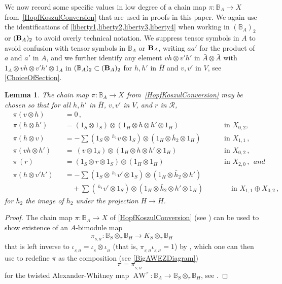 \documentclass[11pt]{amsart}
\numberwithin{equation}{section}
\newtheorem{lemma}[equation]{Lemma}
\newcommand{\R}{\mathcal{R}}
\newcommand{\B}{{\bf B}} %
\newcommand{\BB}{\mathbb{B}} %
\DeclareMathOperator{\AW}{AW}
\DeclareMathOperator{\AWt}{\AW^{\tau}}
\renewcommand{\_}[1]{\mbox{$_{\left( #1 \right)}$}}
\newcommand{\ot}{\otimes}
\newcommand{\ott}{\otimes_{\tau}}
\begin{document}
{We now record some specific values in low degree 
of a chain map 
$ \pi:\BB_A\longrightarrow X$
from~\cref{HopfKoszulConversion}
that are used in proofs in this paper. 
We again use the identifications of \cref{liberty1,liberty2,liberty3,liberty4} when working in $(\BB_A)_2$ or $(\B_A)_2$
to avoid overly technical notation.
We suppress
tensor symbols in $A$ to avoid confusion with tensor symbols
in $\BB_A$ or $\B_A$,
writing $aa'$ for the product of $a$ and $a'$ in $A$, 
and we further identify any element 
$vh\ot v'h'$ in $\bar A\ot \bar A$
with $1_A\ot vh \ot v' h'\ot 1_A$ in $(\BB_A)_2\subset
(\B_A)_2$ for $h, h'$ in $\bar H$ and $v, v'$ in $V$,
see \cref{ChoiceOfSection}.
\begin{lemma}\label{PiInLowDegree}
  The chain map $ \pi:\BB_A\longrightarrow X$
  from~\cref{HopfKoszulConversion}
  may be chosen so that
  for all $h,h'$ in $\bar{H}$, 
  $v,v'$ in $V$, and $r$ in $\R$, 
\begin{equation*}
  \begin{aligned}
    &\pi(v\ot h)
    &&= 0\, ,\\
    &\pi(h\ot h')
    &&= (1_S\ot 1_S)\ot (1_H\ot h \ot h'\ot 1_H)  &&\quad\text{ in } X_{0,2},\\
    &\pi(h\ot v)
    &&= 
      - \sum (1_S \ot \, ^{h_1} v\ot 1_S)\ot (1_H\ot \bar h_2\ot 1_H)
     &&\quad\text{ in } X_{1,1}\, , \\
     &\pi( vh\ot h')
     &&= 
  \  ( v\ot 1_S)\ot (1_H\ot h\ot h'\ot 1_H)
&&\quad\text{ in } X_{0,2}\, , \\
    &\pi\, ( r)
    &&=
(1_S\ot r \ot 1_S)\ot (1_H\ot 1_H)
&&\quad\text{ in } X_{2,0}\, , \ \ { and } \\
&\pi(h\ot v'h')
&&= 
- \sum (1_S \ot\,  ^{h_1}v' \ot 1_S)\ot (1_H\ot \bar h_2\ot h') \\
 & && \quad +  \sum ( \, ^{h_1}v'\ot 1_S)\ot (1_H\ot \bar h_2\ot h'\ot 1_H)
  &&\quad\quad\text{ in } X_{1,1}\oplus X_{0,2}\, ,
\end{aligned}
\end{equation*}
for $\bar h_2$ the image of $h_2$ under the projection $H\rightarrow
\bar H$.
\end{lemma}
%
\begin{proof}
The chain map
$\pi:\BB_A\rightarrow X$
of \cref{HopfKoszulConversion} (see \cite{TTP-AWEZ})
can be used to show existence of an $A$-bimodule map
 $$\pi_{_{S,H}}
: \BB_S\ot_{\tau}\BB_H \rightarrow K_S\ott \BB_H 
\, 
$$
that is left inverse to $\iota_{_{S,H}}= \iota_{_S}\ot \iota_{_H}$
(that is, $\pi_{_{S,H}}\iota_{_{S,H}} = 1$)
by \cite[Corollary 11.10]{TTP-AWEZ},
which one can then use to redefine
$\pi$ as the composition
(see \cref{BigAWEZDiagram})
$$
\pi= \pi_{_{S,H}}\, \AWt 
$$
for the twisted Alexander-Whitney map
$\AW^{\tau}: \BB_A\longrightarrow 
\BB_S\ot_{\tau}\BB_H$, see \cite[Section 4]{TTP-AWEZ}.


\end{proof}}
\end{document}
